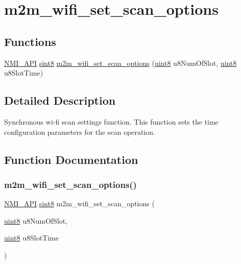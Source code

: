\hypertarget{group__WifiSetScanOptionFn}{}\section{m2m\+\_\+wifi\+\_\+set\+\_\+scan\+\_\+options}
\label{group__WifiSetScanOptionFn}
\subsection*{Functions}
\begin{DoxyCompactItemize}
\item 
\hyperlink{group__BSPDefine_gaecc0323d771e41ef81a76b5f12783e22}{N\+M\+I\+\_\+\+A\+PI} \hyperlink{group__DataT_gae35f10ffd0ac8dd2bc3e794da9bdfbc7}{sint8} \hyperlink{group__WifiSetScanOptionFn_ga588ab7517c383d5f814a7a55125dd83b}{m2m\+\_\+wifi\+\_\+set\+\_\+scan\+\_\+options} (\hyperlink{group__DataT_ga4df709a77647e870bbf1d955b8edc9a6}{uint8} u8\+Num\+Of\+Slot, \hyperlink{group__DataT_ga4df709a77647e870bbf1d955b8edc9a6}{uint8} u8\+Slot\+Time)
\end{DoxyCompactItemize}


\subsection{Detailed Description}
Synchronous wi-\/fi scan settings function. This function sets the time configuration parameters for the scan operation. 

\subsection{Function Documentation}
\mbox{\label{group__WifiSetScanOptionFn_ga588ab7517c383d5f814a7a55125dd83b}} 
\subsubsection{\texorpdfstring{m2m\+\_\+wifi\+\_\+set\+\_\+scan\+\_\+options()}{m2m\_wifi\_set\_scan\_options()}}
{\footnotesize\ttfamily \hyperlink{group__BSPDefine_gaecc0323d771e41ef81a76b5f12783e22}{N\+M\+I\+\_\+\+A\+PI} \hyperlink{group__DataT_gae35f10ffd0ac8dd2bc3e794da9bdfbc7}{sint8} m2m\+\_\+wifi\+\_\+set\+\_\+scan\+\_\+options (\begin{DoxyParamCaption}\item[{\hyperlink{group__DataT_ga4df709a77647e870bbf1d955b8edc9a6}{uint8}}]{u8\+Num\+Of\+Slot,  }\item[{\hyperlink{group__DataT_ga4df709a77647e870bbf1d955b8edc9a6}{uint8}}]{u8\+Slot\+Time }\end{DoxyParamCaption})}



